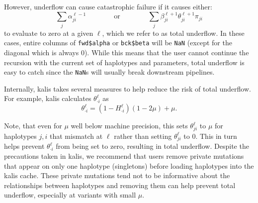 \documentclass[a4paper]{article}
\newcommand{\pkg}[1]{{\fontseries{m}\fontseries{b}\selectfont #1}}
\begin{document}
However, underflow can cause catastrophic failure if it causes either:
\[ \underset{j}{\sum} \alpha_{ji}^{\ell-1} \qquad\qquad \mbox{or} \qquad\qquad \underset{j}{\sum} \beta_{ji}^{\ell+1}\theta_{ji}^{\ell+1} \pi_{ji}\]
to evaluate to zero at a given \(\ell\), which we refer to as total underflow.
In these cases, entire columns of \texttt{fwd\$alpha} or \texttt{bck\$beta} will be \texttt{NaN} (except for the diagonal which is always 0).
While this means that the user cannot continue the recursion with the current set of haplotypes and parameters, total underflow is easy to catch since the \texttt{NaN}s will usually break downstream pipelines.

Internally, \pkg{kalis} takes several measures to help reduce the risk of total underflow.
For example, \pkg{kalis} calculates \(\theta_{\cdot i}^{\ell}\) as
\[
	\theta_{\cdot i}^{\ell} = \left(1 - H_{\cdot i}^{\ell}\right) \left(1-2\mu\right) + \mu .
\]

Note, that even for \(\mu\) well below machine precision, this sets \(\theta_{j i}^{\ell}\) to \(\mu\) for haplotypes \(j,i\) that mismatch at \(\ell\) rather than setting \(\theta_{j i}^{\ell}\) to 0.
This in turn helps prevent \(\theta_{\cdot i}^{\ell}\) from being set to zero, resulting in total underflow.
Despite the precautions taken in \pkg{kalis}, we recommend that users remove private mutations that appear on only one haplotype (singletons) before loading haplotypes into the \pkg{kalis} cache.
These private mutations tend not to be informative about the relationships between haplotypes and removing them can help prevent total underflow, especially at variants with small \(\mu\).
\end{document}
